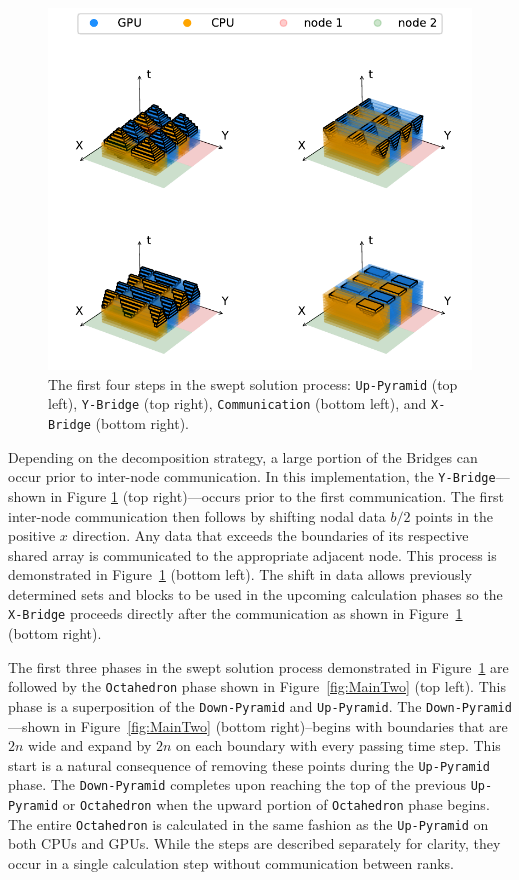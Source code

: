 \documentclass[preprints,article,accept,moreauthors,pdftex]{Definitions/mdpi}
\def\Up{\texttt{Up-Pyramid}}
\def\Down{\texttt{Down-Pyramid}}
\def\Oct{\texttt{Octahedron}}
\def\Xb{\texttt{X-Bridge}}
\def\Yb{\texttt{Y-Bridge}}
\begin{document}
\begin{figure}[htbp]
    \centering
    \includegraphics{figs/SubsPlot1.pdf}
    \caption{The first four steps in the swept solution process: \Up{} (top left), \Yb{} (top right), \texttt{Communication} (bottom left), and \Xb{} (bottom right).}
    \label{fig:MainOne}
\end{figure}

Depending on the decomposition strategy, a large portion of the Bridges can occur prior to inter-node communication. In this implementation, the \Yb{}---shown in Figure \ref{fig:MainOne} (top right)---occurs prior to the first communication. The first inter-node communication then follows by shifting nodal data $b/2$ points in the positive $x$ direction. Any data that exceeds the boundaries of its respective shared array is communicated to the appropriate adjacent node. This process is demonstrated in Figure~\ref{fig:MainOne} (bottom left). The shift in data allows previously determined sets and blocks to be used in the upcoming calculation phases so the \Xb{} proceeds directly after the communication as shown in Figure~\ref{fig:MainOne} (bottom right).

The first three phases in the swept solution process demonstrated in Figure~\ref{fig:MainOne} are followed by the \Oct{} phase shown in Figure~\ref{fig:MainTwo} (top left). This phase is a superposition of the \Down{} and \Up{}. The \Down{}---shown in Figure~\ref{fig:MainTwo} (bottom right)--begins with boundaries that are $2n$ wide and expand by $2n$ on each boundary with every passing time step. This start is a natural consequence of removing these points during the \Up{} phase. The \Down{} completes upon reaching the top of the previous \Up{} or \Oct{} when the upward portion of \Oct{} phase begins. The entire \Oct{} is calculated in the same fashion as the \Up{} on both CPUs and GPUs. While the steps are described separately for clarity, they occur in a single calculation step without communication between ranks. 
\end{document}
